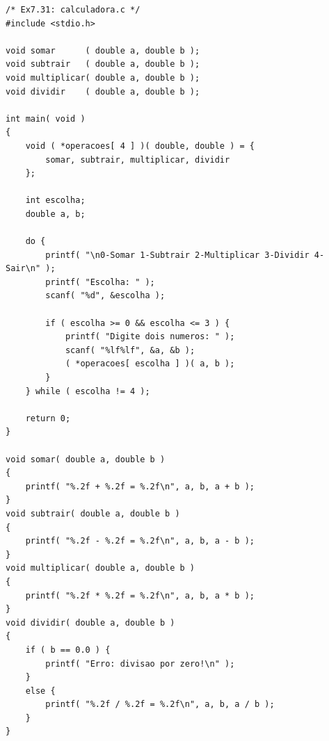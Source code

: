 \documentclass[12pt,a4paper]{article}
\begin{document}
\begin{respostabox}
\begin{lstlisting}
/* Ex7.31: calculadora.c */
#include <stdio.h>

void somar      ( double a, double b );
void subtrair   ( double a, double b );
void multiplicar( double a, double b );
void dividir    ( double a, double b );

int main( void )
{
    void ( *operacoes[ 4 ] )( double, double ) = {
        somar, subtrair, multiplicar, dividir
    };

    int escolha;
    double a, b;

    do {
        printf( "\n0-Somar 1-Subtrair 2-Multiplicar 3-Dividir 4-Sair\n" );
        printf( "Escolha: " );
        scanf( "%d", &escolha );

        if ( escolha >= 0 && escolha <= 3 ) {
            printf( "Digite dois numeros: " );
            scanf( "%lf%lf", &a, &b );
            ( *operacoes[ escolha ] )( a, b );
        }
    } while ( escolha != 4 );

    return 0;
}

void somar( double a, double b )
{
    printf( "%.2f + %.2f = %.2f\n", a, b, a + b );
}
void subtrair( double a, double b )
{
    printf( "%.2f - %.2f = %.2f\n", a, b, a - b );
}
void multiplicar( double a, double b )
{
    printf( "%.2f * %.2f = %.2f\n", a, b, a * b );
}
void dividir( double a, double b )
{
    if ( b == 0.0 ) {
        printf( "Erro: divisao por zero!\n" );
    }
    else {
        printf( "%.2f / %.2f = %.2f\n", a, b, a / b );
    }
}
\end{lstlisting}
\end{respostabox}
\end{document}
